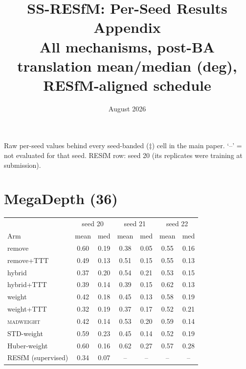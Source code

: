 \documentclass[10pt]{article}
\title{SS-RESfM: Per-Seed Results Appendix\\ \large All mechanisms, post-BA translation mean/median (deg), RESfM-aligned schedule}
\author{}\date{August 2026}
\begin{document}
\maketitle\footnotesize
Raw per-seed values behind every seed-banded ($\ddagger$) cell in the main paper.
`--' = not evaluated for that seed. RESfM row: seed 20 (its replicates were training at submission).

\section*{MegaDepth (36)}
\begin{tabular}{lcccccc}
\toprule
 & \multicolumn{2}{c}{seed 20} & \multicolumn{2}{c}{seed 21} & \multicolumn{2}{c}{seed 22}\\
Arm & mean & med & mean & med & mean & med\\
\midrule
remove & 0.60 & 0.19 & 0.38 & 0.05 & 0.55 & 0.16\\
remove+TTT & 0.49 & 0.13 & 0.51 & 0.15 & 0.55 & 0.13\\
hybrid & 0.37 & 0.20 & 0.54 & 0.21 & 0.53 & 0.15\\
hybrid+TTT & 0.39 & 0.14 & 0.39 & 0.15 & 0.62 & 0.13\\
weight & 0.42 & 0.18 & 0.45 & 0.13 & 0.58 & 0.19\\
weight+TTT & 0.32 & 0.19 & 0.37 & 0.17 & 0.52 & 0.21\\
\textsc{madweight} & 0.42 & 0.14 & 0.53 & 0.20 & 0.59 & 0.14\\
STD-weight & 0.59 & 0.23 & 0.45 & 0.14 & 0.52 & 0.19\\
Huber-weight & 0.60 & 0.16 & 0.62 & 0.27 & 0.57 & 0.28\\
\midrule
RESfM (supervised) & 0.34 & 0.07 & -- & -- & -- & --\\
\bottomrule
\end{tabular}
\vspace{1em}
\end{document}
